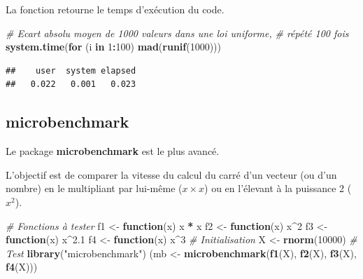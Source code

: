\documentclass[
  12pt,
  french,
  a4paper,
  extrafontsizes,onecolumn,openright
  ]{memoir}
\newenvironment{Shaded}{\begin{snugshade}}{\end{snugshade}}
\newcommand{\CommentTok}[1]{\textcolor[rgb]{0.56,0.35,0.01}{\textit{#1}}}
\newcommand{\ControlFlowTok}[1]{\textcolor[rgb]{0.13,0.29,0.53}{\textbf{#1}}}
\newcommand{\DecValTok}[1]{\textcolor[rgb]{0.00,0.00,0.81}{#1}}
\newcommand{\FloatTok}[1]{\textcolor[rgb]{0.00,0.00,0.81}{#1}}
\newcommand{\KeywordTok}[1]{\textcolor[rgb]{0.13,0.29,0.53}{\textbf{#1}}}
\newcommand{\NormalTok}[1]{#1}
\newcommand{\OperatorTok}[1]{\textcolor[rgb]{0.81,0.36,0.00}{\textbf{#1}}}
\newcommand{\StringTok}[1]{\textcolor[rgb]{0.31,0.60,0.02}{#1}}
\begin{document}
La fonction retourne le temps d'exécution du code.

\scriptsize

\begin{Shaded}
\begin{Highlighting}[]
\CommentTok{# Ecart absolu moyen de 1000 valeurs dans une loi uniforme,}
\CommentTok{# répété 100 fois}
\KeywordTok{system.time}\NormalTok{(}\ControlFlowTok{for}\NormalTok{ (i }\ControlFlowTok{in} \DecValTok{1}\OperatorTok{:}\DecValTok{100}\NormalTok{) }\KeywordTok{mad}\NormalTok{(}\KeywordTok{runif}\NormalTok{(}\DecValTok{1000}\NormalTok{)))}
\end{Highlighting}
\end{Shaded}

\begin{verbatim}
##    user  system elapsed 
##   0.022   0.001   0.023
\end{verbatim}

\normalsize

\hypertarget{microbenchmark}{%
\subsection{microbenchmark}\label{microbenchmark}}

Le package \textbf{microbenchmark} est le plus avancé.

L'objectif est de comparer la vitesse du calcul du carré d'un vecteur (ou d'un nombre) en le multipliant par lui-même (\(x \times x\)) ou en l'élevant à la puissance 2 (\(x^2\)).

\scriptsize

\begin{Shaded}
\begin{Highlighting}[]
\CommentTok{# Fonctions à tester}
\NormalTok{f1 <-}\StringTok{ }\ControlFlowTok{function}\NormalTok{(x) x }\OperatorTok{*}\StringTok{ }\NormalTok{x}
\NormalTok{f2 <-}\StringTok{ }\ControlFlowTok{function}\NormalTok{(x) x}\OperatorTok{^}\DecValTok{2}
\NormalTok{f3 <-}\StringTok{ }\ControlFlowTok{function}\NormalTok{(x) x}\OperatorTok{^}\FloatTok{2.1}
\NormalTok{f4 <-}\StringTok{ }\ControlFlowTok{function}\NormalTok{(x) x}\OperatorTok{^}\DecValTok{3}
\CommentTok{# Initialisation}
\NormalTok{X <-}\StringTok{ }\KeywordTok{rnorm}\NormalTok{(}\DecValTok{10000}\NormalTok{)}
\CommentTok{# Test}
\KeywordTok{library}\NormalTok{(}\StringTok{"microbenchmark"}\NormalTok{)}
\NormalTok{(mb <-}\StringTok{ }\KeywordTok{microbenchmark}\NormalTok{(}\KeywordTok{f1}\NormalTok{(X), }\KeywordTok{f2}\NormalTok{(X), }\KeywordTok{f3}\NormalTok{(X), }\KeywordTok{f4}\NormalTok{(X)))}
\end{Highlighting}
\end{Shaded}
\end{document}
